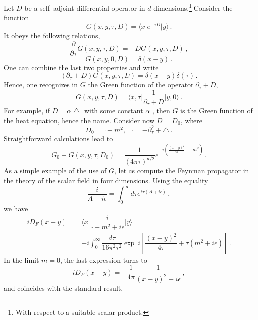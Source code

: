 \documentclass[11pt,a4paper]{article}
\begin{document}
Let $D$ be a self--adjoint differential operator in $d$ dimensions.\footnote{With respect to a suitable scalar product.} Consider the function
\begin{equation}\label{DefOfKernel}
G(x,y,\tau,D)=\langle x\vert e^{-\tau D}\vert y\rangle \,.
\end{equation}
It obeys the following relations,
\begin{equation}
\dfrac{\partial}{\partial\tau}G(x,y,\tau,D)=-DG(x,y,\tau,D) \,,
\end{equation}
\begin{equation}
G(x,y,0,D)=\delta(x-y) \,.
\end{equation}
One can combine the last two properties and write
\begin{equation}
(\partial_\tau+D)G(x,y,\tau,D)=\delta(x-y)\delta(\tau) \,.
\end{equation}
Hence, one recognizes in $G$ the Green function of the operator $\partial_\tau+D$,
\begin{equation}
G(x,y,\tau,D)=\langle x,\tau\vert \dfrac{1}{\partial_\tau+D}\vert y,0\rangle \,.
\end{equation}
For example, if $D=\alpha\bigtriangleup$ with some constant $\alpha$ , then $G$ is the Green function of the heat equation, hence the name. Consider now $D=D_0$, where
\begin{equation}
D_0=\square+m^2, ~~~\square=-\partial_\tau^2+\bigtriangleup \,.
\end{equation}
Straightforward calculations lead to
\begin{equation}
G_0\equiv G(x,y,\tau,D_0)=\dfrac{1}{(4\pi\tau)^{d/2}}e^{-i\left(\frac{(x-y)^2}{4\tau}+\tau m^2\right)} \,.
\end{equation}
As a simple example of the use of $G$, let us compute the Feynman propagator in the theory of the scalar field in four dimensions. Using the equality
\begin{equation}
\dfrac{i}{A+i\epsilon}=\int_0^{\infty}d\tau e^{i\tau(A+i\epsilon)} \,,
\end{equation}
we have
\begin{equation}
\begin{split}
iD_F(x-y)&=\langle x\vert\dfrac{i}{\square+m^2+i\epsilon}\vert y\rangle\\
&=-i\int_0^{\infty}\dfrac{d\tau}{16\pi^2\tau^2}\exp~i\left[\dfrac{(x-y)^2}{4\tau}+\tau(m^2+i\epsilon)\right] \,.
\end{split}
\end{equation}
In the limit $m=0$, the last expression turns to
\begin{equation}
iD_F(x-y)=-\dfrac{1}{4\pi}\dfrac{1}{(x-y)^2-i\epsilon}\,,
\end{equation}
and coincides with the standard result.
\end{document}
